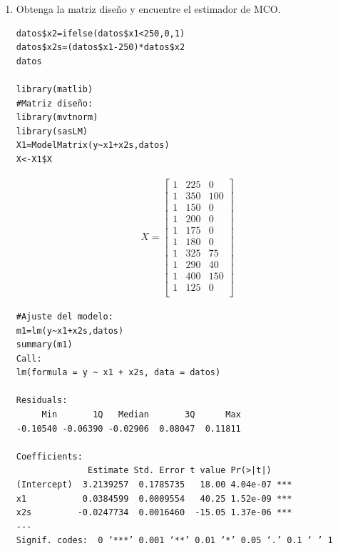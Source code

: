 \documentclass[12pt,a4paper]{report}
\begin{document}
\begin{enumerate}
\begin{enumerate}
La pendiente de la función de respuesta media para envíos cuyo tamaño es mayor que 250 es: $\beta_1+\beta_2$.\\

Como puede observarse, las dos funciones de respuesta media se conectan cuando $x_{1} = 250$:\\
  
De la primera función se tiene: $\mu_Y \mid (x_1=250)=\beta_0 + \beta_1x_1=\beta_0 + 250\beta_1$.\\

De la segunda función se tiene: $\mu_Y \mid (x_1=250)=(\beta_0-250\beta_2) + (\beta_1+\beta_2)x_1=(\beta_0-250\beta_2) + (\beta_1+\beta_2)250=\beta_0 +250 \beta_1$.\\



\item  Obtenga la matriz diseño y encuentre el estimador de MCO. 

\begin{verbatim}
datos$x2=ifelse(datos$x1<250,0,1)
datos$x2s=(datos$x1-250)*datos$x2
datos

library(matlib)
#Matriz diseño:
library(mvtnorm)
library(sasLM)
X1=ModelMatrix(y~x1+x2s,datos)
X<-X1$X
\end{verbatim}

\begin{align*}
X=\begin{bmatrix}
1&225&0\\
1&350&100\\
1&150&0\\
1&200&0\\
1&175&0\\
1&180&0\\
1&325&75\\
1&290&40\\
1&400&150\\
1&125&0\\
\end{bmatrix}
\end{align*}
\begin{verbatim}
#Ajuste del modelo:
m1=lm(y~x1+x2s,datos)
summary(m1)
Call:
lm(formula = y ~ x1 + x2s, data = datos)

Residuals:
     Min       1Q   Median       3Q      Max 
-0.10540 -0.06390 -0.02906  0.08047  0.11811 

Coefficients:
              Estimate Std. Error t value Pr(>|t|)    
(Intercept)  3.2139257  0.1785735   18.00 4.04e-07 ***
x1           0.0384599  0.0009554   40.25 1.52e-09 ***
x2s         -0.0247734  0.0016460  -15.05 1.37e-06 ***
---
Signif. codes:  0 ‘***’ 0.001 ‘**’ 0.01 ‘*’ 0.05 ‘.’ 0.1 ‘ ’ 1


\end{verbatim}
\end{enumerate}
\end{enumerate}
\end{document}
